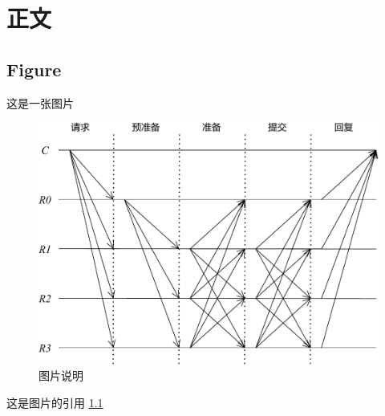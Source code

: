 \chapter{正文}

\section{Figure}

这是一张图片

\begin{figure}[ht]  %
    \centering  %
    \includegraphics[width=0.85\columnwidth]{figures/pbft.pdf}  %
    \caption{图片说明}
    \label{fig:dag}  %
\end{figure}

这是图片的引用 \ref{fig:dag}
